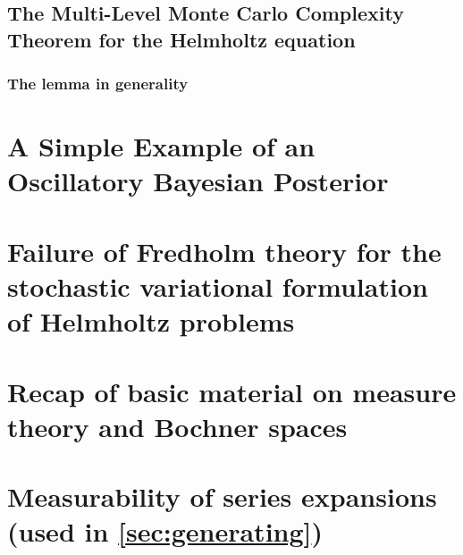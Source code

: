 \documentclass{report}
\begin{document}
\section{The Multi-Level Monte Carlo Complexity Theorem for the Helmholtz equation}\label{sec:comp}



\subsection{The lemma in generality}



\appendix

\chapter{A Simple Example of an Oscillatory Bayesian Posterior}\label{app:osc}


\chapter{Failure of Fredholm theory for the stochastic variational formulation of Helmholtz problems}\label{sec:federico}
 	

\chapter{Recap of basic material on measure theory and Bochner spaces}\label{app:mtBs}


\chapter{Measurability of series expansions (used in \cref{sec:generating})}\label{app:meas}




\end{document}
